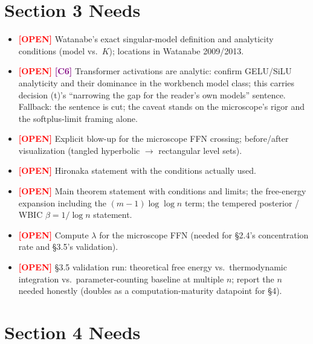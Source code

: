 \documentclass[11pt]{article}
\newcommand{\open}{\textcolor{red}{\textbf{[OPEN]}} }
\newcommand{\cref}[1]{\textcolor{purple}{\textbf{[#1]}} }
\begin{document}
\section{Section 3 Needs}

\begin{itemize}[itemsep=4pt]
\item \open Watanabe's exact singular-model definition and analyticity
conditions (model vs.\ $K$); locations in Watanabe 2009/2013.
\item \open \cref{C6} Transformer activations are analytic: confirm
GELU/SiLU analyticity and their dominance in the workbench model class;
this carries decision (t)'s ``narrowing the gap for the reader's own
models'' sentence. Fallback: the sentence is cut; the caveat stands on
the microscope's rigor and the softplus-limit framing alone.
\item \open Explicit blow-up for the microscope FFN crossing;
before/after visualization (tangled hyperbolic $\to$ rectangular level
sets).
\item \open Hironaka statement with the conditions actually used.
\item \open Main theorem statement with conditions and limits; the
free-energy expansion including the $(m-1)\log\log n$ term; the tempered
posterior / WBIC $\beta = 1/\log n$ statement.
\item \open Compute $\lambda$ for the microscope FFN (needed for \S2.4's
concentration rate and \S3.5's validation).
\item \open \S3.5 validation run: theoretical free energy vs.\
thermodynamic integration vs.\ parameter-counting baseline at multiple
$n$; report the $n$ needed honestly (doubles as a computation-maturity
datapoint for \S4).
\end{itemize}

\section{Section 4 Needs}
\end{document}
